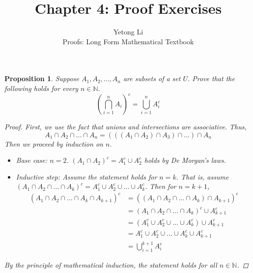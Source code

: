 \documentclass[12pt]{article}
\newcommand{\N}{\mathbb{N}} %
\newtheorem{proposition}{Proposition}
\begin{document}

\title{Chapter 4: Proof Exercises}
\author{Yetong Li \\ Proofs: Long Form Mathematical Textbook}

\maketitle


\begin{proposition}
  Suppose $A_1, A_2, \ldots, A_n$ are subsets of a set $U$.
  Prove that the following holds for every $n \in \N$.
  \[
    \left(\bigcap_{i=1}^n A_i\right)^c = \bigcup_{i=1}^n A_i^c
  \]
  \begin{proof}
    First, we use the fact that unions and intersections are associative.
    Thus,
    \[
      A_1 \cap A_2 \cap \ldots \cap A_n = (((A_1 \cap A_2) \cap A_3) \cap \ldots) \cap A_n
    \]
    Then we proceed by induction on $n$.
    \begin{itemize}
      \item Base case: $n = 2$. $(A_1 \cap A_2)^c = A_1^c \cup A_2^c$ holds by De Morgan's laws.
      \item Inductive step: Assume the statement holds for $n = k$.
            That is, assume $(A_1 \cap A_2 \cap \ldots \cap A_k)^c = A_1^c \cup A_2^c \cup \ldots \cup A_k^c$.
            Then for $n = k + 1$,
            \begin{align*}
              (A_1 \cap A_2 \cap \ldots \cap A_k \cap A_{k+1})^c & =
              ((A_1 \cap A_2 \cap \ldots \cap A_k) \cap A_{k+1})^c                                                            \\
                                                                 & = (A_1 \cap A_2 \cap \ldots \cap A_k)^c \cup A_{k+1}^c     \\
                                                                 & = (A_1^c \cup A_2^c \cup \ldots \cup A_k^c) \cup A_{k+1}^c \\
                                                                 & = A_1^c \cup A_2^c \cup \ldots \cup A_k^c \cup A_{k+1}^c   \\
                                                                 & = \bigcup_{i=1}^{k+1} A_i^c
            \end{align*}
    \end{itemize}
    By the principle of mathematical induction, the statement holds for all $n \in \N$.
  \end{proof}
\end{proposition}


\end{document}

